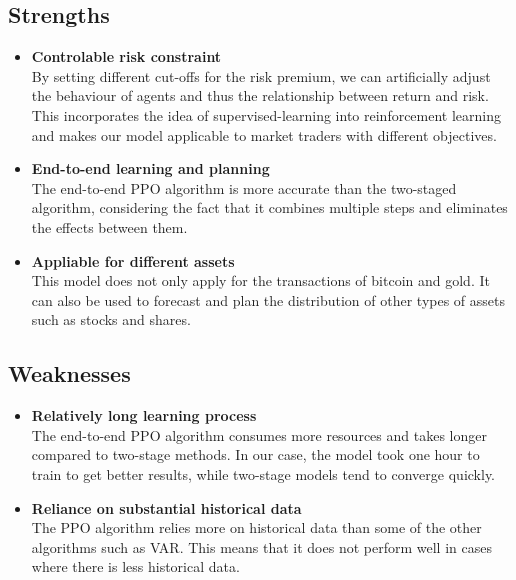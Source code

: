 \documentclass{mcmthesis}
\begin{document}
\subsection{Strengths}
\begin{itemize}
\item \textbf{Controlable risk constraint}\\
By setting different cut-offs for the risk premium, we can artificially adjust the behaviour of agents and thus the relationship between return and risk. This incorporates the idea of supervised-learning into reinforcement learning and makes our model applicable to market traders with different objectives.
\item \textbf{End-to-end learning and planning}\\
The end-to-end PPO algorithm is more accurate than the two-staged algorithm, considering the fact that it combines multiple steps and eliminates the effects between them.
\item \textbf{Appliable for different assets}\\
This model does not only apply for the transactions of bitcoin and gold.
It can also be used to forecast and plan the distribution of other types of assets such as stocks and shares.
\end{itemize}

\subsection{Weaknesses}
\begin{itemize}
  \item \textbf{Relatively long learning process}\\
  The end-to-end PPO algorithm consumes more resources and takes longer compared to two-stage methods.
  In our case, the model took one hour to train to get better results, while two-stage models tend to converge quickly.
  \item \textbf{Reliance on substantial historical data}\\
  The PPO algorithm relies more on historical data than some of the other algorithms such as VAR. This means that it does not perform well in cases where there is less historical data.
\end{itemize}

\end{document}
